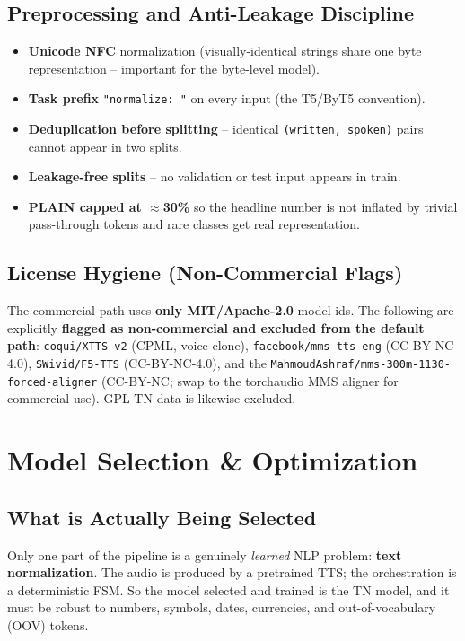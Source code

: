 \documentclass[12pt,a4paper]{article}
\begin{document}
\subsection{Preprocessing and Anti-Leakage Discipline}

\begin{itemize}\setlength\itemsep{0.15em}
  \item \textbf{Unicode NFC} normalization (visually-identical strings share one byte representation -- important for the byte-level model).
  \item \textbf{Task prefix} \texttt{"normalize: "} on every input (the T5/ByT5 convention).
  \item \textbf{Deduplication before splitting} -- identical \texttt{(written, spoken)} pairs cannot appear in two splits.
  \item \textbf{Leakage-free splits} -- no validation or test input appears in train.
  \item \textbf{PLAIN capped at $\approx$30\%} so the headline number is not inflated by trivial pass-through tokens and rare classes get real representation.
\end{itemize}

\subsection{License Hygiene (Non-Commercial Flags)}

The commercial path uses \textbf{only MIT/Apache-2.0} model ids. The following are explicitly \textbf{flagged as non-commercial and excluded from the default path}: \texttt{coqui/XTTS-v2} (CPML, voice-clone), \texttt{facebook/mms-tts-eng} (CC-BY-NC-4.0), \texttt{SWivid/F5-TTS} (CC-BY-NC-4.0), and the \texttt{MahmoudAshraf/mms-300m-1130-forced-aligner} (CC-BY-NC; swap to the torchaudio MMS aligner for commercial use). GPL TN data is likewise excluded.

\section{Model Selection \& Optimization}

\subsection{What is Actually Being Selected}

Only one part of the pipeline is a genuinely \emph{learned} NLP problem: \textbf{text normalization}. The audio is produced by a pretrained TTS; the orchestration is a deterministic FSM. So the model selected and trained is the TN model, and it must be robust to numbers, symbols, dates, currencies, and out-of-vocabulary (OOV) tokens.
\end{document}

